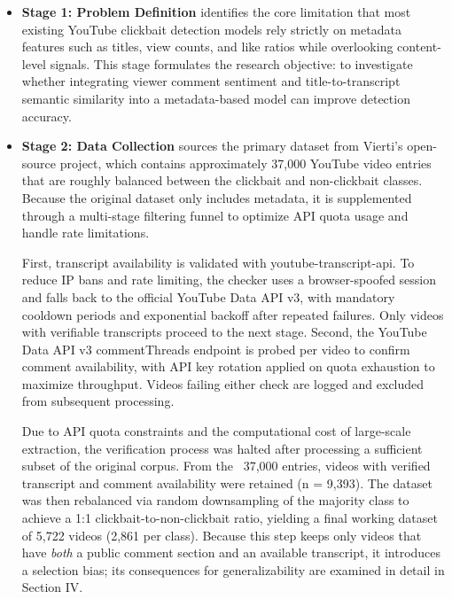 \documentclass[conference]{IEEEtran}
\begin{document}
\begin{itemize}
    \item \textbf{Stage 1: Problem Definition} identifies the core limitation that most existing YouTube clickbait detection models rely strictly on metadata features such as titles, view counts, and like ratios while overlooking content-level signals. This stage formulates the research objective: to investigate whether integrating viewer comment sentiment and title-to-transcript semantic similarity into a metadata-based model can improve detection accuracy.
 
    \item \textbf{Stage 2: Data Collection} sources the primary dataset from Vierti's open-source project, which contains approximately 37,000 YouTube video entries that are roughly balanced between the clickbait and non-clickbait classes. Because the original dataset only includes metadata, it is supplemented through a multi-stage filtering funnel to optimize API quota usage and handle rate limitations.
    
    First, transcript availability is validated with youtube-transcript-api. To reduce IP bans and rate limiting, the checker uses a browser-spoofed session and falls back to the official YouTube Data API v3, with mandatory cooldown periods and exponential backoff after repeated failures. Only videos with verifiable transcripts proceed to the next stage. Second, the YouTube Data API v3 commentThreads endpoint is probed per video to confirm comment availability, with API key rotation applied on quota exhaustion to maximize throughput. Videos failing either check are logged and excluded from subsequent processing.
    
    Due to API quota constraints and the computational cost of large-scale extraction, the verification process was halted after processing a sufficient subset of the original corpus. From the ~37,000 entries, videos with verified transcript and comment availability were retained (n = 9,393). The dataset was then rebalanced via random downsampling of the majority class to achieve a 1:1 clickbait-to-non-clickbait ratio, yielding a final working dataset of 5,722 videos (2,861 per class). Because this step keeps only videos that have \emph{both} a public comment section and an available transcript, it introduces a selection bias; its consequences for generalizability are examined in detail in Section IV.
    

\end{itemize}
\end{document}
